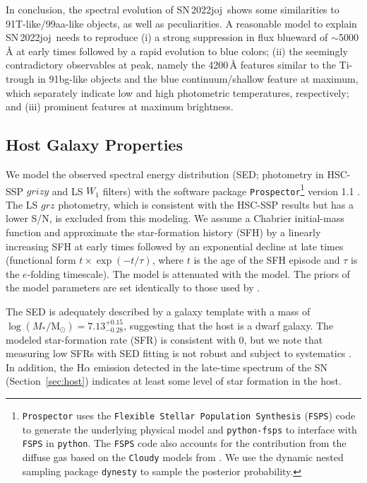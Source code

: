\documentclass[twocolumn]{aastex631}
\newcommand{\sn}{SN\,2022joj}
\begin{document}
\begin{CJK*}{UTF8}{gbsn}
In conclusion, the spectral evolution of \sn\ shows some similarities to 91T-like/99aa-like objects, as well as peculiarities. A reasonable model to explain \sn\ needs to reproduce (i) a strong suppression in flux blueward of $\sim$5000\,\r{A} at early times followed by a rapid evolution to blue colors; (ii) the seemingly contradictory observables at peak, namely the 4200\,\r{A} features similar to the Ti-trough in 91bg-like objects and the blue continuum/shallow  feature at maximum, which separately indicate low and high photometric temperatures, respectively; and (iii) prominent  features at maximum brightness. 



\subsection{Host Galaxy Properties}
We model the observed spectral energy distribution (SED; photometry in HSC-SSP $grizy$ and LS $W_1$ filters) with the software package \texttt{Prospector}\footnote{\texttt{Prospector} uses the \texttt{Flexible Stellar Population Synthesis} (\texttt{FSPS}) code \citep{Conroy_2009} to generate the underlying physical model and \texttt{python-fsps} \citep{ForemanMackey_FSPS_2014} to interface with \texttt{FSPS} in \texttt{python}. The \texttt{FSPS} code also accounts for the contribution from the diffuse gas based on the \texttt{Cloudy} models from \citet{Byler2017a}. We use the dynamic nested sampling package \texttt{dynesty} \citep{Speagle_dynesty_2020} to sample the posterior probability.} version 1.1 \citep{Johnson_prospector_2021}. The LS $grz$ photometry, which is consistent with the HSC-SSP results but has a lower S/N, is excluded from this modeling. We assume a Chabrier initial-mass function \citep[IMF;][]{Chabrier2003a} and approximate the star-formation history (SFH) by a linearly increasing SFH at early times followed by an exponential decline at late times (functional form $t \times \exp\left(-t/\tau\right)$, where $t$ is the age of the SFH episode and $\tau$ is the $e$-folding timescale). The model is attenuated with the \citet{Calzetti2000a} model. The priors of the model parameters are set identically to those used by \citet{Schulze2021a}. 

The SED is adequately described by a galaxy template with a mass of $\log(M_*/\mathrm{M_\odot}) = 7.13^{+0.15}_{-0.28}$, suggesting that the host is a dwarf galaxy. The modeled star-formation rate (SFR) is consistent with 0, but we note that measuring low SFRs with SED fitting is not robust and subject to systematics \citep{Conroy_2013}. In addition, the H$\alpha$ emission detected in the late-time spectrum of the SN (Section~\ref{sec:host}) indicates at least some level of star formation in the host.


\end{CJK*}
\end{document}
